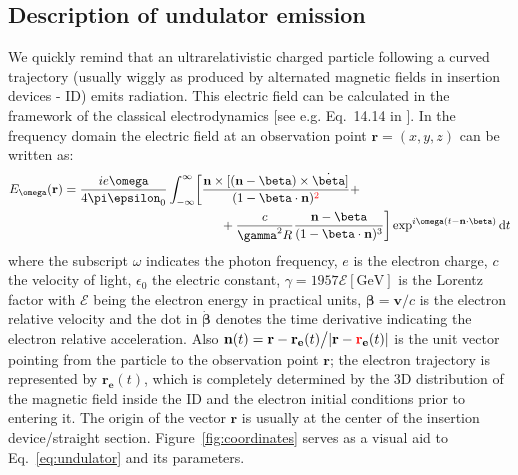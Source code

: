 \documentclass{iucr}              %
\newcommand{\inred}[1]{{\color{red}#1}}
\begin{document}
\subsection{Description of undulator emission}
\label{sec:undulator}

We quickly remind that an ultrarelativistic charged particle following a curved trajectory (usually wiggly as produced by alternated magnetic fields in insertion devices - ID) emits radiation. This electric field can be calculated in the framework of the classical electrodynamics [see e.g. Eq.~14.14 in \cite{jackson}]. In the frequency domain the electric field at an observation point $\textbf{r}=(x,y,z)$ can be written as: 
\begin{equation}
\begin{split}
    E_{\omega}(\textbf{r}) = \frac{i e \omega}{4 \pi \epsilon_0} 
    \int_{-\infty}^{\infty}
    &\biggl[ 
    \frac{\textbf{n} \times [(\textbf{n} - \mathbf{\beta}) \times \dot{\mathbf{\beta}}]}
    {(1- \mathbf{\beta} \cdot \textbf{n})^\inred{2}} +\\
    &\qquad+\frac{c}{\gamma^2 R}   \frac{\textbf{n} - \mathbf{\beta}}{(1-\mathbf{\beta} \cdot \textbf{n})^3} \biggr]
    \exp^{i \omega (t - \textbf{n}\cdot\mathbf{\beta})} \mathrm{d}t
\end{split}\label{eq:undulator}
\end{equation}
where the subscript $\omega$ indicates the photon frequency, $e$ is the electron charge, $c$ the velocity of light, $\epsilon_0$ the electric constant, $\gamma=1957\mathcal{E}[\mathrm{GeV}]$ is the Lorentz factor with $\mathcal{E}$ being the electron energy in practical units, $\mathbf{\beta}=\mathbf{v}\big/c$ is the electron relative velocity and the dot in $\dot{\mathbf{\beta}}$ denotes the time derivative indicating the electron relative acceleration. Also $\textbf{n}(t)=\textbf{r}-\textbf{r}_{\textbf{e}}(t)\big/|\textbf{r}-\textbf{\inred{r}}_{\textbf{e}}(t)|$ is the unit vector pointing from the particle to the observation point $\textbf{r}$; the electron trajectory is represented by $\textbf{r}_{\textbf{e}}(t)$, which is completely determined by the 3D distribution of the magnetic field inside the ID and the electron initial conditions prior to entering it. The origin of the vector $\textbf{r}$ is usually at the center of the insertion device/straight section. Figure~\ref{fig:coordinates} serves as a visual aid to Eq.~\ref{eq:undulator} and its parameters. 
\end{document}

